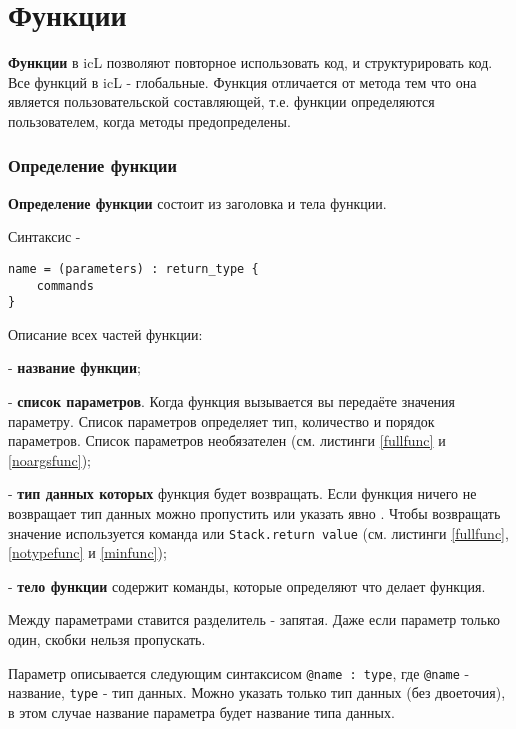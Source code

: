 \section{Функции}

{\bf Функции} в icL позволяют повторное использовать код, и структурировать код. Все функций в icL - глобальные. Функция отличается от метода тем что она является пользовательской составляющей, т.е. функции определяются пользователем, когда методы предопределены.

\subsubsection{Определение функции}

{\bf Определение функции} состоит из заголовка и тела функции.

\noindent Синтаксис -
\begin{lstlisting}[numbers=none]
name = (parameters) : return_type {
	commands
}
\end{lstlisting}

Описание всех частей функции:
\begin{icItems}
\item
	 - {\bf название функции};
\item
	 - {\bf список параметров}. Когда функция вызывается вы передаёте значения параметру. Список параметров определяет тип, количество и порядок параметров. Список параметров необязателен (см. листинги \ref{fullfunc} и \ref{noargsfunc});
\item
	 - {\bf тип данных которых} функция будет возвращать. Если функция ничего не возвращает тип данных можно пропустить или указать явно \void{}. Чтобы возвращать значение используется команда  или \lstinline|Stack.return value| (см. листинги \ref{fullfunc}, \ref{notypefunc} и \ref{minfunc});
\item
	 - {\bf тело функции} содержит команды, которые определяют что делает функция.
\end{icItems}

Между параметрами ставится разделитель - запятая. Даже если параметр только один, скобки нельзя пропускать.

Параметр описывается следующим синтаксисом \lstinline|@name : type|, где \lstinline|@name| - название, \lstinline|type| - тип данных. Можно указать только тип данных (без двоеточия), в этом случае название параметра будет название типа данных.

